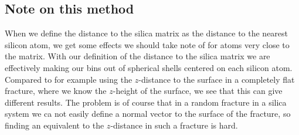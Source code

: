 \subsection{Note on this method\label{sec:distance_to_matrix_issues}}
%
When we define the distance to the silica matrix as the distance to the nearest silicon atom, we get some effects we should take note of for atoms very close to the matrix. With our definition of the distance to the silica matrix we are effectively making our bins out of spherical shells centered on each silicon atom. Compared to for example using the $z$-distance to the surface in a completely flat fracture, where we know the $z$-height of the surface, we see that this can give different results. The problem is of course that in a random fracture in a silica system we ca not easily define a normal vector to the surface of the fracture, so finding an equivalent to the $z$-distance in such a fracture is hard.


